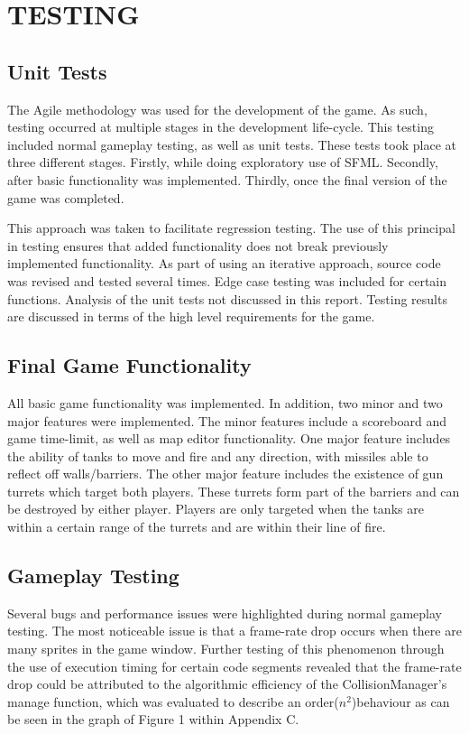 \documentclass[10pt,twocolumn]{witseiepaper}
\begin{document}
%
\section{TESTING} 

\subsection{Unit Tests}
The Agile methodology was used for the development of the game. As such, testing occurred at multiple stages in the development life-cycle. This testing included normal gameplay testing, as well as unit tests. These tests took place at three different stages. Firstly, while doing exploratory use of SFML. Secondly, after basic functionality was implemented. Thirdly, once the final version of the game was completed.

This approach was taken to facilitate regression testing. The use of this principal in testing ensures that added functionality does not break previously implemented functionality. As part of using an iterative approach, source code was revised and tested several times. Edge case testing was included for certain functions. Analysis of the unit tests not discussed in this report. Testing results are discussed in terms of the high level requirements for the game.

\subsection{Final Game Functionality}
All basic game functionality was implemented. In addition, two minor and two major features were implemented. The minor features include a scoreboard and game time-limit, as well as map editor functionality. One major feature includes the ability of tanks to move and fire and any direction, with missiles able to reflect off walls/barriers. The other major feature includes the existence of gun turrets which target both players. These turrets form part of the barriers and can be destroyed by either player. Players are only targeted when the tanks are within a certain range of the turrets and are within their line of fire.

\subsection{Gameplay Testing}
Several bugs and performance issues were highlighted during normal gameplay testing. The most noticeable issue is that a frame-rate drop occurs when there are many sprites in the game window. Further testing of this phenomenon through the use of execution timing for certain code segments revealed that the frame-rate drop could be attributed to the algorithmic efficiency of the CollisionManager's manage function, which was evaluated to describe an order($n^{2}$)behaviour as can be seen in the graph of Figure 1 within Appendix C. 
\end{document}
